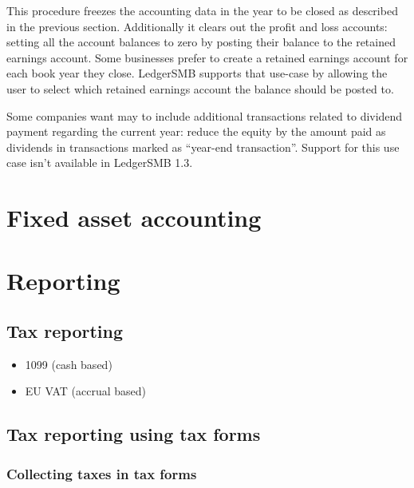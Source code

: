 This procedure freezes the accounting data in the year to be closed as described
in the previous section. Additionally it clears out the profit and loss accounts:
setting all the account
balances to zero by posting their balance to the retained earnings account. Some
businesses prefer to create a retained earnings account for each book year they
close. LedgerSMB supports that use-case by allowing the user to select which
retained earnings account the balance should be posted to.

Some companies want may to include additional transactions related to dividend
payment regarding the current year: reduce the equity by the amount paid as
dividends in transactions marked as ``year-end transaction''. Support
for this use case isn't available in LedgerSMB 1.3.




\section{Fixed asset accounting}
\label{sec-business-processes-accounting-fixed-asset-accounting}



\section{Reporting}
\label{sec-business-processes-accounting-reporting}

\subsection{Tax reporting}
\label{subsec-business-processes-accounting-reporting-tax}


\begin{itemize}
\item 1099 (cash based)
\item EU \gls{VAT} (accrual based)
\end{itemize}


\subsection{Tax reporting using tax forms}
\label{subsec-business-processes-accounting-reporting-tax-with-taxforms}

\subsubsection{Collecting taxes in tax forms}
\label{subsubsec-business-processes-accounting-reporting-tax-collecting-taxforms}


